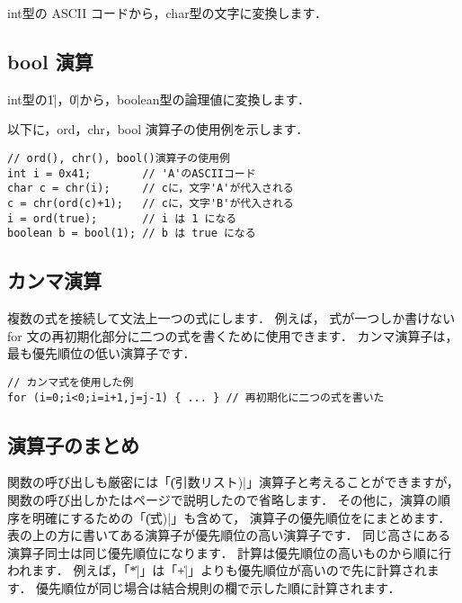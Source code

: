 int型の ASCII コードから，char型の文字に変換します．

\subsection{bool 演算}
\label{chap3:bool}

int型の\|1|，\|0|から，boolean型の論理値に変換します．

以下に，ord，chr，bool 演算子の使用例を示します．

\begin{mylist}
\begin{verbatim}
// ord(), chr(), bool()演算子の使用例
int i = 0x41;        // 'A'のASCIIコード
char c = chr(i);     // cに，文字'A'が代入される
c = chr(ord(c)+1);   // cに，文字'B'が代入される
i = ord(true);       // i は 1 になる
boolean b = bool(1); // b は true になる
\end{verbatim}
\end{mylist}

\subsection{カンマ演算}
複数の式を接続して文法上一つの式にします．
例えば，
式が一つしか書けない for 文の再初期化部分に二つの式を書くために使用できます．
カンマ演算子は，最も優先順位の低い演算子です．

\begin{mylist}
\begin{verbatim}
// カンマ式を使用した例
for (i=0;i<0;i=i+1,j=j-1) { ... } // 再初期化に二つの式を書いた
\end{verbatim}
\end{mylist}

\subsection{演算子のまとめ}

関数の呼び出しも厳密には「\|(引数リスト)|」演算子と考えることができますが，
関数の呼び出しかたは\pageref{chap3:func}ページで説明したので省略します．
その他に，演算の順序を明確にするための「\|(式)|」も含めて，
演算子の優先順位をにまとめます．
表の上の方に書いてある演算子が優先順位の高い演算子です．
同じ高さにある演算子同士は同じ優先順位になります．
計算は優先順位の高いものから順に行われます．
例えば，「\|*|」は「\|+|」よりも優先順位が高いので先に計算されます．
優先順位が同じ場合は結合規則の欄で示した順に計算されます．


